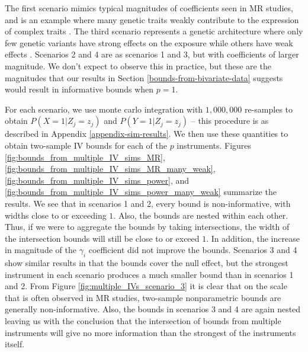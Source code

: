 \documentclass[
]{article}
\theoremstyle{plain}
\begin{document}
The first scenario mimics typical magnitudes of coefficients seen in MR studies, and is an example where many genetic traits weakly contribute to the expression of complex traits \autocite{loh_contrasting_2015,shi_contrasting_2016,nj_genetic_2017}. The third scenario represents a genetic architecture where only few genetic variants have strong effects on the exposure while others have weak effects \autocite{yang_common_2010}. Scenarios 2 and 4 are as scenarios 1 and 3, but with coefficients of larger magnitude. We don't expect to observe this in practice, but these are the magnitudes that our results in Section \ref{bounds-from-bivariate-data} suggests would result in informative bounds when \(p = 1\).

For each scenario, we use monte carlo integration with \(1,000,000\) re-samples to obtain \(P(X = 1 | Z_j = z_j)\) and \(P(Y = 1 | Z_j = z_j)\) -- this procedure is as described in Appendix \ref{appendix-sim-results}. We then use these quantities to obtain two-sample IV bounds for each of the \(p\) instruments. Figures \ref{fig:bounds_from_multiple_IV_sims_MR}, \ref{fig:bounds_from_multiple_IV_sims_MR_many_weak}, \ref{fig:bounds_from_multiple_IV_sims_power}, and \ref{fig:bounds_from_multiple_IV_sims_power_many_weak} summarize the results. We see that in scenarios 1 and 2, every bound is non-informative, with widths close to or exceeding \(1\). Also, the bounds are nested within each other. Thus, if we were to aggregate the bounds by taking intersections, the width of the intersection bounds will still be close to or exceed \(1\). In addition, the increase in magnitude of the \(\gamma_i\) coefficient did not improve the bounds. Scenarios 3 and 4 show similar results in that the bounds cover the null effect, but the strongest instrument in each scenario produces a much smaller bound than in scenarios 1 and 2. From Figure \ref{fig:multiple_IVs_scenario_3} it is clear that on the scale that is often observed in MR studies, two-sample nonparametric bounds are generally non-informative. Also, the bounds in scenarios 3 and 4 are again nested leaving us with the conclusion that the intersection of bounds from multiple instruments will give no more information than the strongest of the instruments itself.
\end{document}
